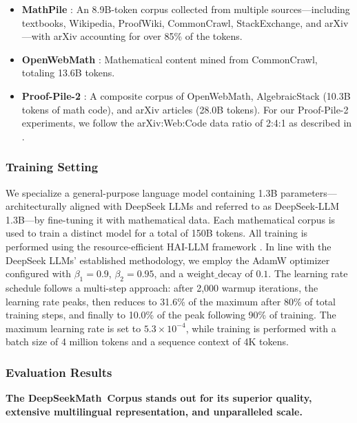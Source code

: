 \begin{itemize}[topsep=0pt]
    \item \textbf{MathPile} \citep{mathpile}: An 8.9B-token corpus collected from multiple sources—including textbooks, Wikipedia, ProofWiki, CommonCrawl, StackExchange, and arXiv—with arXiv accounting for over 85\% of the tokens.
    \item \textbf{OpenWebMath} \citep{openwebmath}: Mathematical content mined from CommonCrawl, totaling 13.6B tokens.
    \item \textbf{Proof-Pile-2} \citep{llemma}: A composite corpus of OpenWebMath, AlgebraicStack (10.3B tokens of math code), and arXiv articles (28.0B tokens). For our Proof-Pile-2 experiments, we follow the arXiv:Web:Code data ratio of 2:4:1 as described in \cite{llemma}.
\end{itemize}

\subsubsection{Training Setting}
\label{sec:quality-policy}
We specialize a general-purpose language model containing 1.3B parameters—architecturally aligned with DeepSeek LLMs \citep{deepseek-llm} and referred to as DeepSeek-LLM 1.3B—by fine-tuning it with mathematical data. Each mathematical corpus is used to train a distinct model for a total of 150B tokens. All training is performed using the resource-efficient HAI-LLM framework \citep{haillm}. In line with the DeepSeek LLMs' established methodology, we employ the AdamW optimizer \citep{adamW} configured with $\beta_1=0.9$, $\beta_2=0.95$, and a $\mathrm{weight\_decay}$ of $0.1$. The learning rate schedule follows a multi-step approach: after 2{,}000 warmup iterations, the learning rate peaks, then reduces to 31.6\% of the maximum after 80\% of total training steps, and finally to 10.0\% of the peak following 90\% of training. The maximum learning rate is set to $5.3\times10^{-4}$, while training is performed with a batch size of 4 million tokens and a sequence context of 4K tokens.

\subsubsection{Evaluation Results}

\textbf{The DeepSeekMath~Corpus stands out for its superior quality, extensive multilingual representation, and unparalleled scale.}

